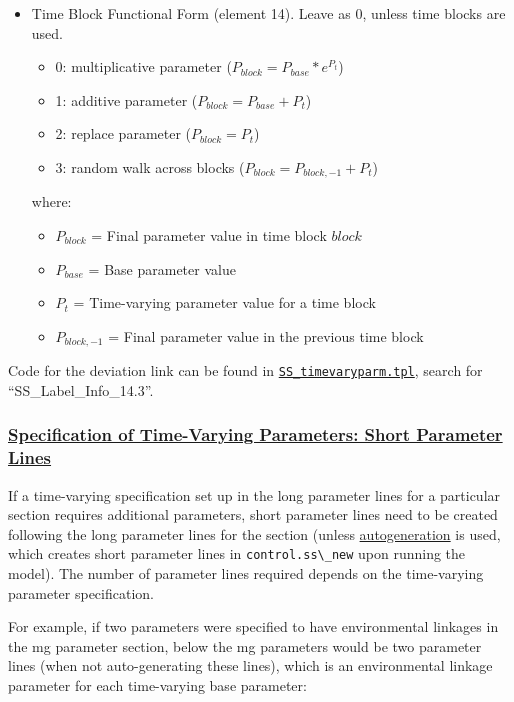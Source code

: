 \begin{itemize}
\item Time Block Functional Form (element 14). Leave as 0, unless time blocks are used.
	\begin{itemize}
		\item 0: multiplicative parameter ($P_{block} = P_{base}*e^{P_t}$)
		\item 1: additive parameter ($P_{block} = P_{base} + P_t$)
		\item 2: replace parameter ($P_{block} = P_t$)
		\item 3: random walk across blocks ($P_{block} = P_{block,-1} + P_t$)
	\end{itemize}
	where:
	\begin{itemize}
        \item $P_{block}$ = Final parameter value in time block $block$
        \item $P_{base}$ = Base parameter value
		\item $P_{t}$ = Time-varying parameter value for a time block
		\item $P_{block,-1}$ = Final parameter value in the previous time block
     \end{itemize}
\end{itemize}


Code for the deviation link can be found in \href{https://github.com/nmfs-ost/ss3-source-code/blob/main/SS_timevaryparm.tpl}{\texttt{SS\_timevaryparm.tpl}}, search for ``SS\_Label\_Info\_14.3''.

\hypertarget{SpecTVShort}{}
\subsubsection[Specification of Time-Varying Parameters: Short Parameter Lines]{\protect\hyperlink{SpecTVShort}{Specification of Time-Varying Parameters: Short Parameter Lines}}

If a time-varying specification set up in the long parameter lines for a particular section requires additional parameters, short parameter lines need to be created following the long parameter lines for the section (unless \hyperlink{autogen}{autogeneration} is used, which creates short parameter lines in \verb|control.ss\_new| upon running the model). The number of parameter lines required depends on the time-varying parameter specification.

For example, if two parameters were specified to have environmental linkages in the \gls{mg} parameter section, below the \gls{mg} parameters would be two parameter lines (when not auto-generating these lines), which is an environmental linkage parameter for each time-varying base parameter:

